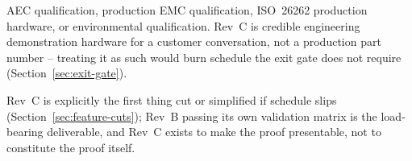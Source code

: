 \begin{decision}[title={Explicitly not required of Rev C}]
AEC qualification, production EMC qualification, ISO~26262 production hardware, or environmental qualification. Rev~C is credible engineering demonstration hardware for a customer conversation, not a production part number -- treating it as such would burn schedule the exit gate does not require (Section~\ref{sec:exit-gate}).
\end{decision}

Rev~C is explicitly the first thing cut or simplified if schedule slips (Section~\ref{sec:feature-cuts}); Rev~B passing its own validation matrix is the load-bearing deliverable, and Rev~C exists to make the proof presentable, not to constitute the proof itself.
